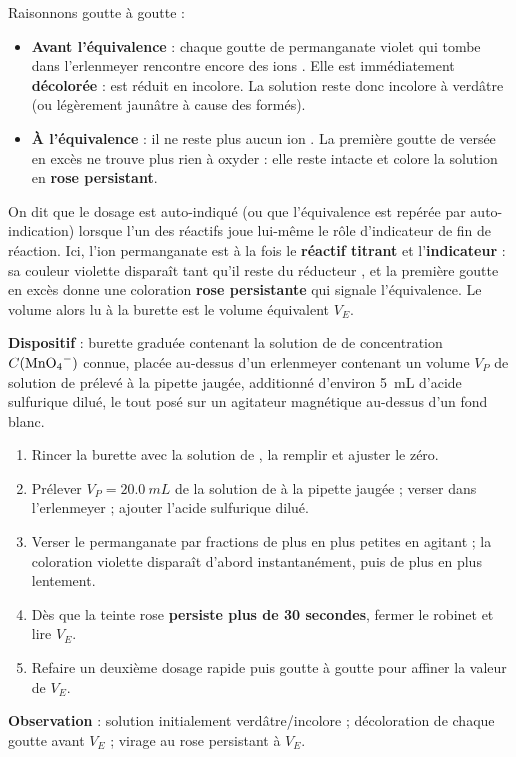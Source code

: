\documentclass[11pt]{article}
\newcommand{\cle}[1]{{\popxbold\color{popdark}#1}}
\begin{document}
Raisonnons goutte à goutte :

\begin{itemize}
\item \textbf{Avant l'équivalence} : chaque goutte de permanganate violet qui tombe dans l'erlenmeyer rencontre encore des ions . Elle est immédiatement \textbf{décolorée} :  est réduit en  incolore. La solution reste donc incolore à verdâtre (ou légèrement jaunâtre à cause des  formés).
\item \textbf{À l'équivalence} : il ne reste plus aucun ion . La première goutte de  versée en excès ne trouve plus rien à oxyder : elle reste intacte et colore la solution en \textbf{rose persistant}.
\end{itemize}

\begin{definition}
On dit que le dosage est \cle{auto-indiqué} (ou que l'équivalence est repérée par \cle{auto-indication}) lorsque l'un des réactifs joue lui-même le rôle d'indicateur de fin de réaction. Ici, l'ion permanganate  est à la fois le \textbf{réactif titrant} et l'\textbf{indicateur} : sa couleur violette disparaît tant qu'il reste du réducteur , et la première goutte en excès donne une coloration \textbf{rose persistante} qui signale l'équivalence. Le volume alors lu à la burette est le volume équivalent $V_E$.
\end{definition}

\begin{experience}
\textbf{Dispositif} : burette graduée contenant la solution de  de concentration $C(\ce{MnO4-})$ connue, placée au-dessus d'un erlenmeyer contenant un volume $V_P$ de solution de  prélevé à la pipette jaugée, additionné d'environ \SI{5}{mL} d'acide sulfurique dilué, le tout posé sur un agitateur magnétique au-dessus d'un fond blanc.
\begin{enumerate}
\item Rincer la burette avec la solution de , la remplir et ajuster le zéro.
\item Prélever $V_P = \SI{20,0}{mL}$ de la solution de  à la pipette jaugée ; verser dans l'erlenmeyer ; ajouter l'acide sulfurique dilué.
\item Verser le permanganate par fractions de plus en plus petites en agitant ; la coloration violette disparaît d'abord instantanément, puis de plus en plus lentement.
\item Dès que la teinte rose \textbf{persiste plus de 30 secondes}, fermer le robinet et lire $V_E$.
\item Refaire un deuxième dosage rapide puis goutte à goutte pour affiner la valeur de $V_E$.
\end{enumerate}
\textbf{Observation} : solution initialement verdâtre/incolore ; décoloration de chaque goutte avant $V_E$ ; virage au rose persistant à $V_E$.
\end{experience}
\end{document}

